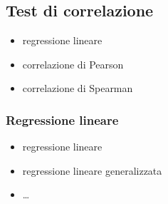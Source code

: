 \documentclass[letterpaper,10pt,italian]{jupyterBook}
\begin{document}
\sphinxstepscope


\subsection{Test di correlazione}
\label{\detokenize{ch/statistics/hp-test-correlation:test-di-correlazione}}\label{\detokenize{ch/statistics/hp-test-correlation::doc}}
\sphinxAtStartPar
{}
\begin{itemize}
\item {} 
\sphinxAtStartPar
regressione lineare

\item {} 
\sphinxAtStartPar
correlazione di Pearson

\item {} 
\sphinxAtStartPar
correlazione di Spearman

\end{itemize}


\subsubsection{Regressione lineare}
\label{\detokenize{ch/statistics/hp-test-correlation:regressione-lineare}}\begin{itemize}
\item {} 
\sphinxAtStartPar
regressione lineare

\item {} 
\sphinxAtStartPar
regressione lineare generalizzata

\item {} 
\sphinxAtStartPar
…

\end{itemize}
\end{document}
